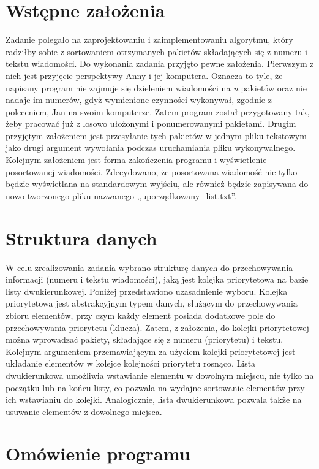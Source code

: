 \documentclass[12pt]{article}
\begin{document}
    


\section{Wstępne założenia}
Zadanie polegało na zaprojektowaniu i zaimplementowaniu algorytmu, który radziłby sobie z sortowaniem otrzymanych 
pakietów składających się z numeru i tekstu wiadomości. Do wykonania zadania przyjęto pewne założenia. 
Pierwszym z nich jest przyjęcie perspektywy Anny i jej komputera. Oznacza to tyle, że napisany program nie zajmuje się 
dzieleniem wiadomości na \textit{n} pakietów oraz nie nadaje im numerów, gdyż wymienione czynności wykonywał,
zgodnie z poleceniem, Jan na swoim komputerze. Zatem program został przygotowany tak, żeby pracować już z 
losowo ułożonymi i ponumerowanymi pakietami. Drugim przyjętym założeniem jest przesyłanie tych pakietów w jednym 
pliku tekstowym jako drugi argument wywołania podczas uruchamiania pliku wykonywalnego. Kolejnym założeniem jest
forma zakończenia programu i wyświetlenie posortowanej wiadomości. Zdecydowano, że posortowana wiadomość
nie tylko będzie wyświetlana na standardowym wyjściu, ale również będzie zapisywana do nowo 
tworzonego pliku nazwanego ,,uporządkowany\_list.txt''. 

\section{Struktura danych}
W celu zrealizowania zadania wybrano strukturę danych do przechowywania informacji (numeru i tekstu wiadomości), 
jaką jest kolejka priorytetowa na bazie listy dwukierunkowej. Poniżej przedstawiono uzasadnienie wyboru.
Kolejka priorytetowa jest abstrakcyjnym typem danych, służącym do przechowywania 
zbioru elementów, przy czym każdy element posiada dodatkowe pole do przechowywania priorytetu 
(klucza). Zatem, z założenia, do kolejki priorytetowej można wprowadzać pakiety, składające się 
z numeru (priorytetu) i tekstu. Kolejnym argumentem przemawiającym za użyciem kolejki priorytetowej 
jest układanie elementów w kolejce kolejności priorytetu rosnąco. Lista dwukierunkowa umożliwia wstawianie elementu 
w dowolnym miejscu, nie tylko na początku lub na końcu listy, co pozwala na wydajne sortowanie elementów przy ich 
wstawianiu do kolejki. Analogicznie, lista dwukierunkowa pozwala także na 
usuwanie elementów z dowolnego miejsca.

\section{Omówienie programu}
\end{document}
